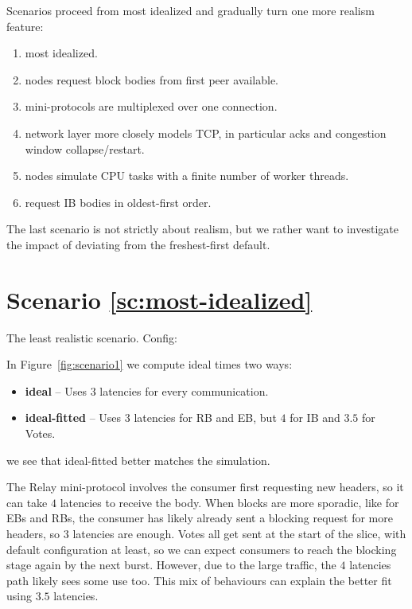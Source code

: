 \documentclass[11pt,a4paper]{article}
\begin{document}
Scenarios proceed from most idealized and gradually turn one more realism feature:
\begin{enumerate}
\item \label{sc:most-idealized} most idealized.
\item \label{sc:request-from-first} nodes request block bodies from first peer available.
\item \label{sc:multiplexing} mini-protocols are multiplexed over one connection.
\item \label{sc:tcp} network layer more closely models TCP, in particular acks
  and congestion window collapse/restart.
\item \label{sc:boundedcpu} nodes simulate CPU tasks with a finite number of worker threads.
\item \label{sc:order} request IB bodies in oldest-first order.
\end{enumerate}
The last scenario is not strictly about realism, but we rather want to
investigate the impact of deviating from the freshest-first default.

\section{Scenario \ref{sc:most-idealized}}
\label{scenario1}
The least realistic scenario. Config:


In Figure~\ref{fig:scenario1} we compute ideal times two ways:
\begin{itemize}
\item \textbf{ideal} -- Uses $3$ latencies for every communication.
\item \textbf{ideal-fitted} -- Uses $3$ latencies for RB and EB, but $4$ for IB and $3.5$ for Votes.
\end{itemize}
we see that ideal-fitted better matches the simulation.

The Relay mini-protocol involves the consumer first requesting new headers, so
it can take $4$ latencies to receive the body. When blocks are more sporadic,
like for EBs and RBs, the consumer has likely already sent a blocking request
for more headers, so $3$ latencies are enough.
Votes all get sent at the start of the slice, with default configuration at least, so we can expect consumers to reach the blocking stage again by the next burst. However, due to the large traffic, the $4$ latencies path likely sees some use too. This mix of behaviours can explain the better fit using $3.5$ latencies.
\end{document}
